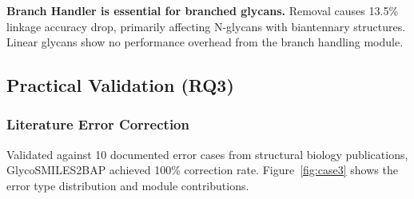 \documentclass[11pt,a4paper]{article}
\begin{document}
\textbf{Branch Handler is essential for branched glycans.} Removal causes 13.5\% linkage accuracy drop, primarily affecting N-glycans with biantennary structures. Linear glycans show no performance overhead from the branch handling module.

\subsection{Practical Validation (RQ3)}

\subsubsection{Literature Error Correction}
Validated against 10 documented error cases from structural biology publications, GlycoSMILES2BAP achieved 100\% correction rate. Figure~\ref{fig:case3} shows the error type distribution and module contributions.
\end{document}
